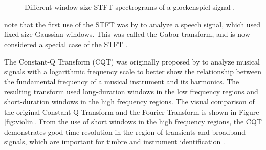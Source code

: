 \documentclass[report.tex]{subfiles}
\begin{document}
\begin{figure}[ht]
	\centering
	\\
	\\
	\caption{Different window size STFT spectrograms of a glockenspiel signal \parencite[1]{jaillet}.}
	\label{fig:stfttradeoff}
\end{figure}

\textcite{dictionary} note that the first use of the STFT was by \textcite{gabor1946} to analyze a speech signal, which used fixed-size Gaussian windows. This was called the Gabor transform, and is now considered a special case of the STFT \parencite{dictionary}.

The Constant-Q Transform (CQT) was originally proposed by \textcite{jbrown} to analyze musical signals with a logarithmic frequency scale to better show the relationship between the fundamental frequency of a musical instrument and its harmonics. The resulting transform used long-duration windows in the low frequency regions and short-duration windows in the high frequency regions. The visual comparison of the original Constant-Q Transform and the Fourier Transform is shown in Figure \ref{fig:violin}. From the use of short windows in the high frequency regions, the CQT demonstrates good time resolution \parencite{cqtransient} in the region of transients and broadband signals, which are important for timbre and instrument identification \parencite{timbretransients1, timbretransients2}.
\end{document}
